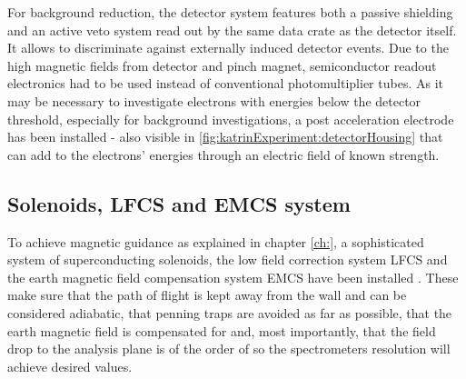       
      For background reduction, the detector system features both a passive shielding and an active veto system read out by the same data crate as the detector itself. It allows to discriminate against externally induced detector events. Due to the high magnetic fields from detector and pinch magnet, semiconductor readout electronics had to be used instead of conventional photomultiplier tubes.
      As it may be necessary to investigate electrons with energies below the detector threshold, especially for background investigations, a post acceleration electrode has been installed - also visible in \ref{fig:katrinExperiment:detectorHousing} that can add to the electrons' energies through an electric field of known strength.
      
      \subsection{Solenoids, LFCS and EMCS system}
      \label{ch:The KATRIN experiment:sec:Experimental setup:subsec:Solenoids, LFCS and EMCS system}
      
      To achieve magnetic guidance as explained in chapter \ref{ch:}, a sophisticated system of superconducting solenoids, the low field correction system LFCS and the earth magnetic field compensation system EMCS have been installed \cite{airCoilSystem}. These make sure that the path of flight is kept away from the wall and can be considered adiabatic, that penning traps are avoided as far as possible, that the earth magnetic field is compensated for and, most importantly, that the field drop to the analysis plane is of the order of  so the spectrometers resolution will achieve desired values.
      

